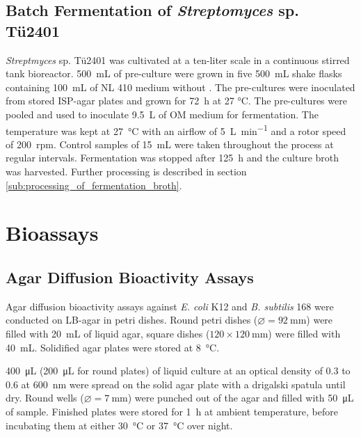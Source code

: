 	\subsection{Batch Fermentation of \emph{Streptomyces} sp. Tü2401} %
	\label{sub:fermentation}
	\textit{Streptmyces} sp. Tü2401 was cultivated at a ten-liter scale in a continuous stirred tank bioreactor. \SI{500}{\milli\liter} of pre-culture were grown in five \SI{500}{\milli\liter} shake flasks containing \SI{100}{\milli\liter} of NL 410 medium without . The pre-cultures were inoculated from stored ISP-agar plates and grown for \SI{72}{\hour} at 27 \si{\celsius}. The pre-cultures were pooled and used to inoculate \SI{9.5}{\liter} of OM medium for fermentation. The temperature was kept at \SI{27}{\celsius} with an airflow of \SI{5}{\liter\per\minute} and a rotor speed of 200~rpm. Control samples of \SI{15}{\milli\liter} were taken throughout the process at regular intervals. Fermentation was stopped after \SI{125}{\hour} and the culture broth was harvested. Further processing is described in section \ref{sub:processing_of_fermentation_broth}.



\clearpage

\section{Bioassays} %
\label{sec:bioassays}

	\subsection{Agar Diffusion Bioactivity Assays} %
	\label{sub:agar_diffusion_bioactivity_assays}

	Agar diffusion bioactivity assays against \emph{E. coli} K12 and \emph{B. subtilis} 168 were conducted on LB-agar in petri dishes. Round petri dishes ($\varnothing=\SI{92}{\milli\meter}$) were filled with \SI{20}{\milli\liter} of liquid agar, square dishes ($120\times \SI{120}{\milli\meter}$) were filled with \SI{40}{\milli\liter}. Solidified agar plates were stored at \SI{8}{\celsius}.

	\SI{400}{\micro\liter} (\SI{200}{\micro\liter} for round plates) of liquid culture at an optical density of 0.3 to 0.6 at \SI{600}{\nano\meter} were spread on the solid agar plate with a drigalski spatula until dry. Round wells ($\varnothing=\SI{7}{\milli\meter}$) were punched out of the agar and filled with \SI{50}{\micro\liter} of sample. Finished plates were stored for \SI{1}{\hour} at ambient temperature, before incubating them at either \SI{30}{\celsius} or \SI{37}{\celsius} over night.

